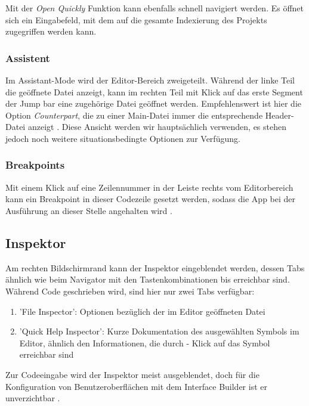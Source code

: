 \documentclass[parskip=half, final]{scrreprt}
\begin{document}
Mit der \emph{Open Quickly} Funktion  kann ebenfalls schnell navigiert werden. Es öffnet sich ein Eingabefeld, mit dem auf die gesamte Indexierung des Projekts zugegriffen werden kann.

\subsubsection{Assistent}

Im Assistant-Mode wird der Editor-Bereich zweigeteilt. Während der linke Teil die geöffnete Datei anzeigt, kann im rechten Teil mit Klick auf das erste Segment der Jump bar eine zugehörige Datei geöffnet werden. Empfehlenswert ist hier die Option \emph{Counterpart}, die zu einer Main-Datei immer die entsprechende Header-Datei anzeigt . Diese Ansicht werden wir hauptsächlich verwenden, es stehen jedoch noch weitere situationsbedingte Optionen zur Verfügung.

\subsubsection{Breakpoints}\label{sec:breakpoints}

Mit einem Klick auf eine Zeilennummer in der Leiste rechts vom Editorbereich kann ein Breakpoint in dieser Codezeile gesetzt werden, sodass die App bei der Ausführung an dieser Stelle angehalten wird .

\subsection{Inspektor}\label{sec:inspektor}

Am rechten Bildschirmrand kann der Inspektor eingeblendet werden, dessen Tabs ähnlich wie beim Navigator mit den Tastenkombinationen  bis  erreichbar sind. Während Code geschrieben wird, sind hier nur zwei Tabs verfügbar:
\begin{enumerate}
\item 'File Inspector': Optionen bezüglich der im Editor geöffneten Datei
\item 'Quick Help Inspector': Kurze Dokumentation des ausgewählten Symbols im Editor, ähnlich den Informationen, die durch \keys{\altkey} - Klick auf das Symbol erreichbar sind
\end{enumerate}
Zur Codeeingabe wird der Inspektor meist ausgeblendet, doch für die Konfiguration von Benutzeroberflächen mit dem Interface Builder ist er unverzichtbar .
\end{document}
